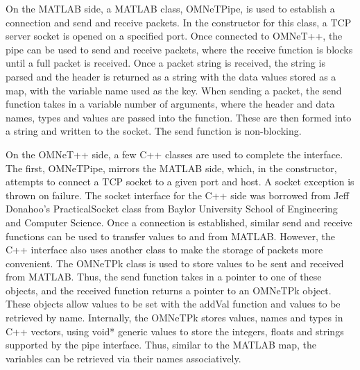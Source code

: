 On the MATLAB side, a MATLAB class, OMNeTPipe, is used to establish a connection and send and receive packets. In the constructor for this class, a TCP server socket is opened on a specified port. Once connected to OMNeT++, the pipe can be used to send and receive packets, where the receive function is blocks until a full packet is received. Once a packet string is received, the string is parsed and the header is returned as a string with the data values stored as a map, with the variable name used as the key. When sending a packet, the send function takes in a variable number of arguments, where the header and data names, types and values are passed into the function. These are then formed into a string and written to the socket. The send function is non-blocking.

On the OMNeT++ side, a few C++ classes are used to complete the interface. The first, OMNeTPipe, mirrors the MATLAB side, which, in the constructor, attempts to connect a TCP socket to a given port and host. A socket exception is thrown on failure. The socket interface for the C++ side was borrowed from Jeff Donahoo's PracticalSocket class from Baylor University School of Engineering and Computer Science. Once a connection is established, similar send and receive functions can be used to transfer values to and from MATLAB. However, the C++ interface also uses another class to make the storage of packets more convenient. The OMNeTPk class is used to store values to be sent and received from MATLAB. Thus, the send function takes in a pointer to one of these objects, and the received function returns a pointer to an OMNeTPk object. These objects allow values to be set with the addVal function and values to be retrieved by name. Internally, the OMNeTPk stores values, names and types in C++ vectors, using void* generic values to store the integers, floats and strings supported by the pipe interface. Thus, similar to the MATLAB map, the variables can be retrieved via their names associatively.

